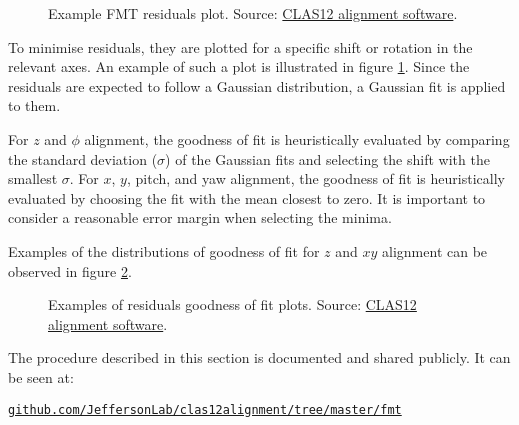     \begin{figure}[b!]
        \centering{}
        \caption[Example FMT residuals plot]{Example FMT residuals plot.
        Source: \hyperlink{github.com/JeffersonLab/clas12alignment}{CLAS12 alignment software}.}
        \label{fig::res_example}
    \end{figure}

    To minimise residuals, they are plotted for a specific shift or rotation in the relevant axes.
    An example of such a plot is illustrated in figure \ref{fig::res_example}.
    Since the residuals are expected to follow a Gaussian distribution, a Gaussian fit is applied to them.

    For $z$ and $\phi$ alignment, the goodness of fit is heuristically evaluated by comparing the standard deviation ($\sigma$) of the Gaussian fits and selecting the shift with the smallest $\sigma$.
    For $x$, $y$, pitch, and yaw alignment, the goodness of fit is heuristically evaluated by choosing the fit with the mean closest to zero.
    It is important to consider a reasonable error margin when selecting the minima.

    Examples of the distributions of goodness of fit for $z$ and $xy$ alignment can be observed in figure \ref{fig::resfit_example}.

    \begin{figure}[t!]
        \centering{}
        \caption[Examples of residuals goodness of fit plots]{Examples of residuals goodness of fit plots.
        Source: \hyperlink{github.com/JeffersonLab/clas12alignment}{CLAS12 alignment software}.}
        \label{fig::resfit_example}
    \end{figure}

    
    

    The procedure described in this section is documented and shared publicly.
    It can be seen at:

    \href{github.com/JeffersonLab/clas12alignment/tree/master/fmt}{\texttt{github.com/JeffersonLab/clas12alignment/tree/master/fmt}}
